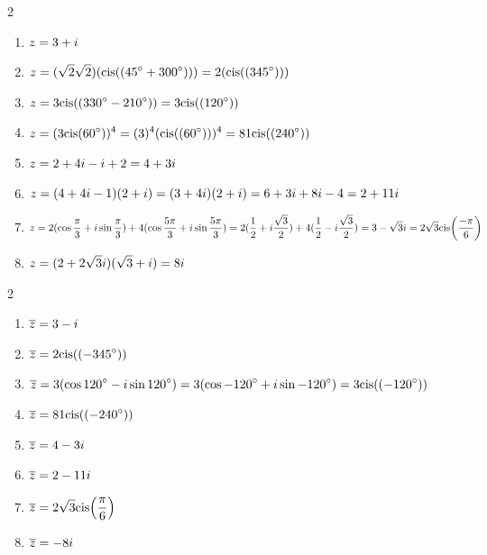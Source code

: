 \begin{solution}
    \text{ }

    \begin{multicols}{2}
    \begin{enumerate}[label=(\alph*)]
        \item $\displaystyle z = 3 + i$
        \item $\displaystyle z = (\sqrt{2} \sqrt{2})(\mathrm{cis}\!\left((45^\circ + 300^\circ)\right)) \\ 
        = 2(\mathrm{cis}\!\left((345^\circ)\right))$
        \item $\displaystyle z = 3 \mathrm{cis}\!\left((330^\circ - 210^\circ)\right) = 3 \mathrm{cis}\!\left((120^\circ)\right)$
        \item $\displaystyle z = (3\mathrm{cis}\!\left(60^\circ\right))^4 \\
        = (3)^4(\mathrm{cis}\!\left((60^\circ)\right))^4 \\ 
        = 81 \mathrm{cis}\!\left((240^\circ)\right)$
        \item $\displaystyle z = 2 + 4i - i + 2 = 4 + 3i$

        \columnbreak

        \item $\displaystyle z = (4 + 4i -1)(2 + i) \\
        = (3 + 4i)(2 + i) = 6 + 3i + 8i - 4 = 2 + 11i$
        \item $\displaystyle z = 2 (\cos{\frac{\pi}{3}} + i \sin{\frac{\pi}{3}}) + 4 (\cos{\frac{5\pi}{3}} + i \sin{\frac{5\pi}{3}}) \\
        = 2 (\frac{1}{2} + i \frac{\sqrt{3}}{2}) + 4(\frac{1}{2} - i \frac{\sqrt{3}}{2}) = 3 - \sqrt{3}i \\
        = 2\sqrt{3} \mathrm{cis}\!\left(\frac{-\pi}{6}\right)$
        \item $\displaystyle z = (2 + 2 \sqrt{3} i)(\sqrt3 + i) = 8i$
    \end{enumerate}
    \end{multicols}
\end{solution}

\begin{solution}
    \text{ }

    \begin{multicols}{2}
        \begin{enumerate}[label=(\alph*)]
        \item $\displaystyle \overline{z} = 3 - i$
        \item $\displaystyle \overline{z} = 2 \mathrm{cis}\!\left((-345^\circ)\right)$
        \item $\displaystyle \overline{z} = 3 (\cos{120^\circ} - i \sin{120^\circ}) \\
        = 3 (\cos{-120^\circ} + i \sin{-120^\circ}) \\
        = 3 \mathrm{cis}\!\left((-120^\circ)\right)$
        \item $\displaystyle \overline{z} = 81 \mathrm{cis}\!\left((-240^\circ)\right)$
        \item $\displaystyle \overline{z} = 4 - 3i$
        \item $\displaystyle \overline{z} = 2 - 11i$
        \item $\displaystyle \overline{z} = 2\sqrt{3} \mathrm{cis}\!\left(\frac{\pi}{6}\right)$
        \item $\displaystyle \overline{z} = -8i$
    \end{enumerate}
    \end{multicols}
\end{solution}


